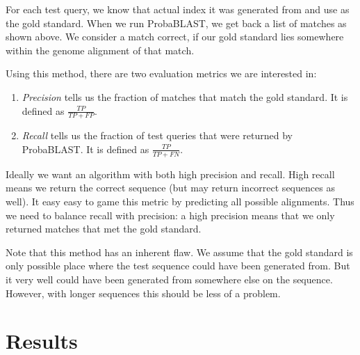 \documentclass[12pt]{IEEEtran}
\begin{document}
For each test query, we know that actual index it was generated from and use as the gold standard. When we run ProbaBLAST, we get back a list of matches as shown above. We consider a match correct, if our gold standard lies somewhere within the genome alignment of that match.

Using this method, there are two evaluation metrics we are interested in:

\begin{enumerate}
\item \emph{Precision} tells us the fraction of matches that match the gold standard. It is defined as $\frac{TP}{TP+FP}$.
\item \emph{Recall} tells us the fraction of test queries that were returned by ProbaBLAST. It is defined as $\frac{TP}{TP+FN}$.
\end{enumerate}

Ideally we want an algorithm with both high precision and recall. High recall means we return the correct sequence (but may return incorrect sequences as well). It easy easy to game this metric by predicting all possible alignments. Thus we need to balance recall with precision: a high precision means that we only returned matches that met the gold standard.

Note that this method has an inherent flaw. We assume that the gold standard is only possible place where the test sequence could have been generated from. But it very well could have been generated from somewhere else on the sequence. However, with longer sequences this should be less of a problem.

\section{Results}
\end{document}
